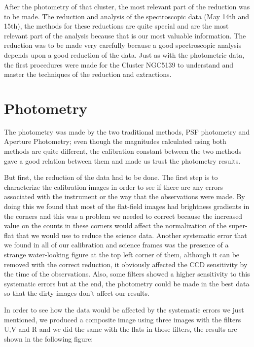 After the photometry of that cluster, the most relevant part of the reduction was to be made. The reduction and analysis of the spectroscopic data (May 14th and 15th), the methods for these reductions are quite special and are the most relevant part of the analysis because that is our most valuable information. The reduction was to be made very carefully because a good spectroscopic analysis depends upon a good reduction of the data. Just as with the photometric data, the first procedures were made for the Cluster NGC5139 to understand and master the techniques of the reduction and extractions.

\section{Photometry}

The photometry was made by the two traditional methods, PSF photometry and Aperture Photometry; even though the magnitudes calculated using both methods are quite different, the calibration constant between the two methods gave a good relation between them and made us trust the photometry results.

But first, the reduction of the data had to be done. The first step is to characterize the calibration images in order to see if there are any errors associated with the instrument or the way that the observations were made. By doing this we found that most of the flat-field images had brightness gradients in the corners and this was a problem we needed to correct because the increased value on the counts in these corners would affect the normalization of the super-flat that we would use to reduce the science data. Another systematic error that we found in all of our calibration and science frames was the presence of a strange water-looking figure at the top left corner of them, although it can be removed with the correct reduction, it obviously affected the CCD sensitivity by the time of the observations. Also, some filters showed a higher sensitivity to this systematic errors but at the end, the photometry could be made in the best data so that the dirty images don't affect our results.

In order to see how the data would be affected by the systematic errors we just mentioned, we produced a composite image using three images with the filters U,V and R and we did the same with the flats in those filters, the results are shown in the following figure:
  
